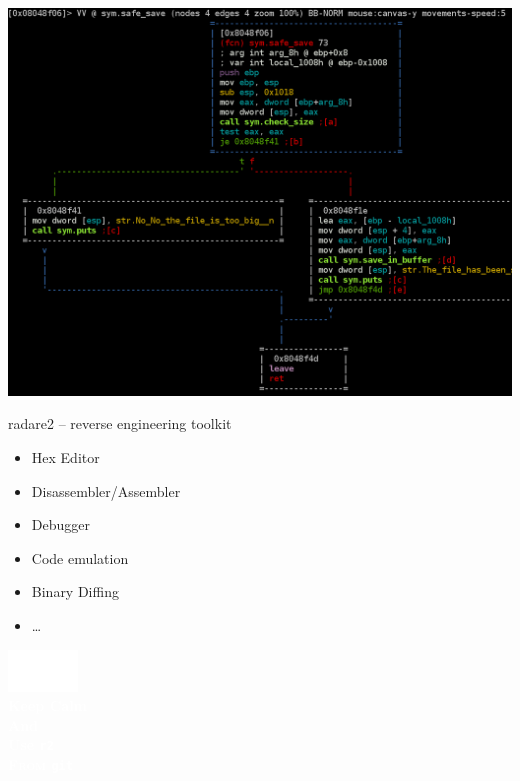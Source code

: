 {\begin{frame}[plain]
  \begin{center}
    \includegraphics[width=\textwidth]{./images/radare-disas2.png}
  \end{center}
\end{frame}
}

\begin{frame}

\end{frame}

\begin{frame}
  {radare2 -- reverse engineering toolkit}

  \begin{itemize}
    \item Hex Editor
    \item Disassembler/Assembler
    \item Debugger
    \item Code emulation
    \item Binary Diffing
    \item \ldots
  \end{itemize}
\end{frame}

{
\begin{frame}[plain]
  \begin{center}
    \includegraphics[height=3em]{./images/r2logo.pdf}\\
    \Huge\textbf{\textcolor{white}{%
      Keep Calm \\
      And \\
    Use \texttt{r2} \\
    \textsc{From }\texttt{git}}}
  \end{center}
\end{frame}
}

